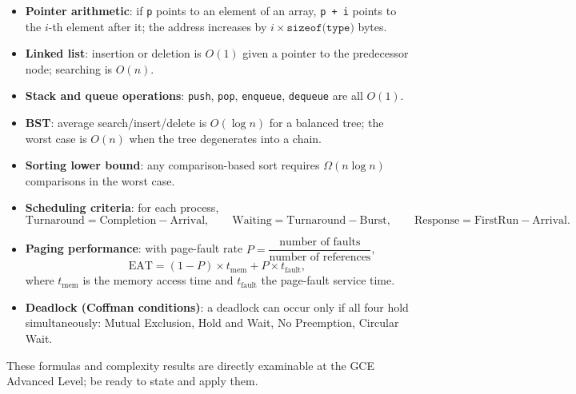 \documentclass[11pt]{article}
\begin{document}
\begin{propriete}
\begin{itemize}
\item \textbf{Pointer arithmetic}: if \texttt{p} points to an element of an array, \texttt{p + i} points to the $i$-th element after it; the address increases by $i \times \texttt{sizeof(type)}$ bytes.
\item \textbf{Linked list}: insertion or deletion is $O(1)$ given a pointer to the predecessor node; searching is $O(n)$.
\item \textbf{Stack and queue operations}: \texttt{push}, \texttt{pop}, \texttt{enqueue}, \texttt{dequeue} are all $O(1)$.
\item \textbf{BST}: average search/insert/delete is $O(\log n)$ for a balanced tree; the worst case is $O(n)$ when the tree degenerates into a chain.
\item \textbf{Sorting lower bound}: any comparison-based sort requires $\Omega(n \log n)$ comparisons in the worst case.
\item \textbf{Scheduling criteria}: for each process,
\[ \text{Turnaround} = \text{Completion} - \text{Arrival}, \qquad \text{Waiting} = \text{Turnaround} - \text{Burst}, \qquad \text{Response} = \text{FirstRun} - \text{Arrival}. \]
\item \textbf{Paging performance}: with page-fault rate $P = \dfrac{\text{number of faults}}{\text{number of references}}$,
\[ \text{EAT} = (1-P)\times t_{\text{mem}} + P \times t_{\text{fault}}, \]
where $t_{\text{mem}}$ is the memory access time and $t_{\text{fault}}$ the page-fault service time.
\item \textbf{Deadlock (Coffman conditions)}: a deadlock can occur only if all four hold simultaneously: Mutual Exclusion, Hold and Wait, No Preemption, Circular Wait.
\end{itemize}
These formulas and complexity results are directly examinable at the GCE Advanced Level; be ready to state and apply them.
\end{propriete}
\end{document}

